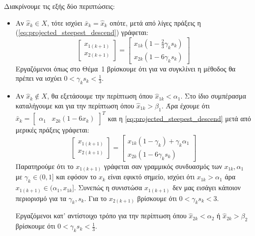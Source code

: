 \documentclass[a4paper,12pt]{article}
\begin{document}
Διακρίνουμε τις εξής δύο περιπτώσεις:
\begin{itemize}
    \item Αν $\hat{x}_k \in X$, τότε ισχύει $\bar{x}_k = \hat{x}_k$ οπότε, μετά από λίγες πράξεις η 
    (\ref{eq:projected_steepest_descend}) γράφεται:
    \begin{equation}
        \begin{bmatrix} x_{1(k+1)} \\ x_{2(k+1)} \end{bmatrix} = 
        \begin{bmatrix} x_{1k} \left(1 - \frac{2}{3} \gamma_k s_k \right) \\ x_{2k} (1 - 6 \gamma_k s_k) \end{bmatrix}
    \end{equation}
    Εργαζόμενοι όπως στο Θέμα~1 βρίσκουμε ότι για να συγκλίνει η μέθοδος θα πρέπει να ισχύει 
    $0 < \gamma_k s_k < \frac{1}{3}$.

    \item Αν $\hat{x}_k \notin X$, θα εξετάσουμε την περίπτωση όπου $\hat{x}_{1k} < \alpha_1$.
    Στο ίδιο συμπέρασμα καταλήγουμε και για την περίπτωση όπου $\hat{x}_{1k} > \beta_1$. Άρα έχουμε
    ότι $\bar{x}_k = \begin{bmatrix} \alpha_1 & x_{2k} (1 - 6 x_k)\end{bmatrix}^T$ και η 
    \ref{eq:projected_steepest_descend} μετά από μερικές πράξεις γράφεται:
    \begin{equation}
        \begin{bmatrix} x_{1(k+1)} \\ x_{2(k+1)} \end{bmatrix} = 
        \begin{bmatrix} x_{1k} (1 - \gamma_k) + \gamma_k \alpha_1 \\ x_{2k} (1 - 6 \gamma_k s_k) \end{bmatrix}
    \end{equation}
    Παρατηρούμε ότι το $x_{1(k+1)}$ γράφεται σαν γραμμικός συνδυασμός των $x_{1k}, \alpha_1$ με $\gamma_k \in (0, 1]$
    και εφόσον το $x_k$ είναι εφικτό σημείο, ισχύει ότι $x_{1k} > \alpha_1$ άρα $x_{1(k+1)} \in (\alpha_1, x_{1k}]$.
    Συνεπώς η συνιστώσα $x_{1(k+1)}$ δεν μας εισάγει κάποιον περιορισμό για τα $\gamma_k, s_k$. Για το $x_{2(k+1)}$ 
    βρίσκουμε ότι $0 < \gamma_k s_k < 3$. 
    
    Εργαζόμενοι κατ' αντίστοιχο τρόπο για την περίπτωση όπου $\hat{x}_{2k} < \alpha_2$ ή $\hat{x}_{2k} > \beta_2$
    βρίσκουμε ότι $0 < \gamma_k s_k < \frac{1}{3}$.
\end{itemize}
\end{document}

